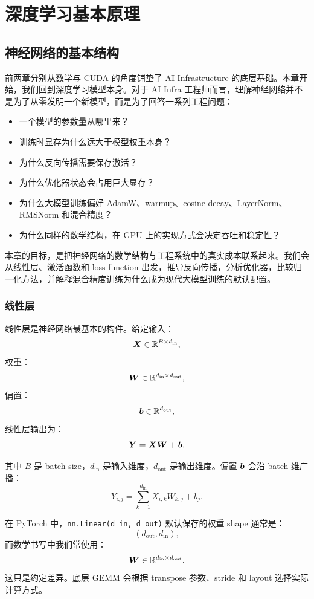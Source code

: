 \chapter{深度学习基本原理}
\label{chap:deep-learning-basics}

\section{神经网络的基本结构}
\label{sec:nn-basic-structure}

前两章分别从数学与 CUDA 的角度铺垫了 AI Infrastructure 的底层基础。本章开始，我们回到深度学习模型本身。对于 AI Infra 工程师而言，理解神经网络并不是为了从零发明一个新模型，而是为了回答一系列工程问题：

\begin{itemize}
\item 一个模型的参数量从哪里来？
\item 训练时显存为什么远大于模型权重本身？
\item 为什么反向传播需要保存激活？
\item 为什么优化器状态会占用巨大显存？
\item 为什么大模型训练偏好 AdamW、warmup、cosine decay、LayerNorm、RMSNorm 和混合精度？
\item 为什么同样的数学结构，在 GPU 上的实现方式会决定吞吐和稳定性？
\end{itemize}

本章的目标，是把神经网络的数学结构与工程系统中的真实成本联系起来。我们会从线性层、激活函数和 loss function 出发，推导反向传播，分析优化器，比较归一化方法，并解释混合精度训练为什么成为现代大模型训练的默认配置。

\subsection{线性层}
\label{subsec:linear-layer}

线性层是神经网络最基本的构件。给定输入：
\[
\bm{X}\in\mathbb{R}^{B\times d_{\mathrm{in}}},
\]
权重：
\[
\bm{W}\in\mathbb{R}^{d_{\mathrm{in}}\times d_{\mathrm{out}}},
\]
偏置：
\[
\bm{b}\in\mathbb{R}^{d_{\mathrm{out}}},
\]
线性层输出为：
\[
\bm{Y}=\bm{X}\bm{W}+\bm{b}.
\]

其中 $B$ 是 batch size，$d_{\mathrm{in}}$ 是输入维度，$d_{\mathrm{out}}$ 是输出维度。偏置 $\bm{b}$ 会沿 batch 维广播：
\[
Y_{i,j}=\sum_{k=1}^{d_{\mathrm{in}}}X_{i,k}W_{k,j}+b_j.
\]

在 PyTorch 中，\texttt{nn.Linear(d_in, d_out)} 默认保存的权重 shape 通常是：
\[
(d_{\mathrm{out}},d_{\mathrm{in}}),
\]
而数学书写中我们常使用：
\[
\bm{W}\in\mathbb{R}^{d_{\mathrm{in}}\times d_{\mathrm{out}}}.
\]
这只是约定差异。底层 GEMM 会根据 transpose 参数、stride 和 layout 选择实际计算方式。

